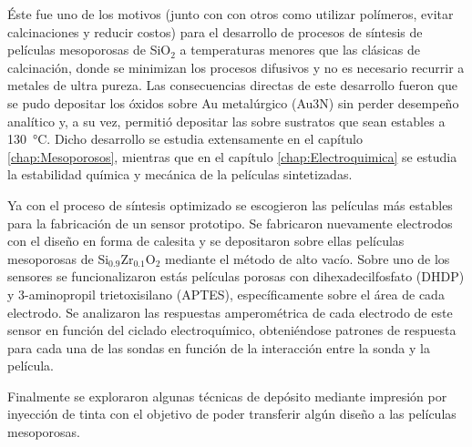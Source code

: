 	Éste fue uno de los motivos (junto con con otros como utilizar polímeros, evitar calcinaciones y reducir costos) para el desarrollo de procesos de síntesis de películas mesoporosas de SiO$_2$ a temperaturas menores que las clásicas de calcinación, donde se minimizan los procesos difusivos y no es necesario recurrir a metales de ultra pureza. Las consecuencias directas de este desarrollo fueron que se pudo depositar los óxidos sobre Au metalúrgico (Au3N) sin perder desempeño analítico y, a su vez, permitió depositar las \pdm\space sobre sustratos que sean estables a \SI{130}{\celsius}. Dicho desarrollo se estudia extensamente en el capítulo \ref{chap:Mesoporosos}, mientras que en el capítulo \ref{chap:Electroquimica} se estudia la estabilidad química y mecánica de la películas sintetizadas.

	Ya con el proceso de síntesis optimizado se escogieron las películas más estables para la fabricación de un sensor prototipo. Se fabricaron nuevamente electrodos con el diseño en forma de calesita y se depositaron sobre ellas películas mesoporosas de Si$_{0.9}$Zr$_{0.1}$O$_2$ mediante el método de alto vacío. Sobre uno de los sensores se funcionalizaron estás películas porosas con dihexadecilfosfato (DHDP) y 3-aminopropil trietoxisilano (APTES), específicamente sobre el área de cada electrodo.
	Se analizaron las respuestas amperométrica de cada electrodo de este sensor en función del ciclado electroquímico, obteniéndose patrones de respuesta para cada una de las sondas en función de la interacción entre la sonda y la película. 
	
	Finalmente se exploraron algunas técnicas de depósito mediante impresión por inyección de tinta con el objetivo de poder transferir algún diseño a las películas mesoporosas.

	